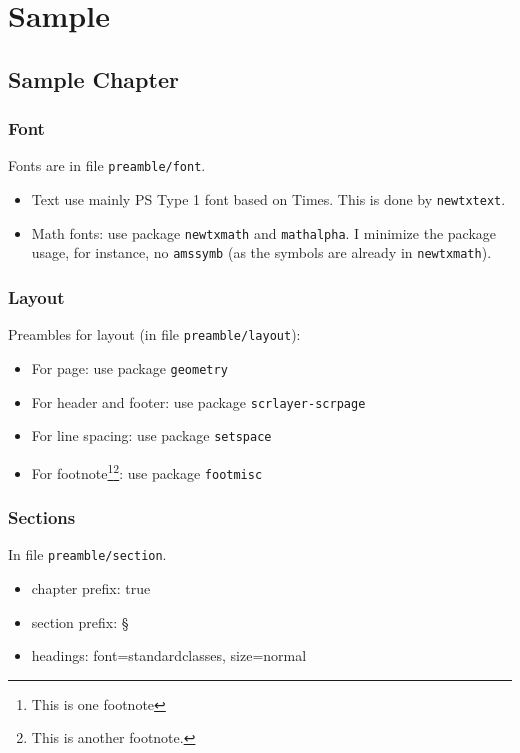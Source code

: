 \documentclass[%
	draft, %
	12pt, %
]{scrbook} %
\begin{document}
\frontmatter
\maketitle
\tableofcontents
\begin{abstract}
	
\end{abstract}
\begin{dedication}
	
\end{dedication}
\begin{acknowledgement}
	
\end{acknowledgement}
\mainmatter
\part{Sample}
\chapter{Sample Chapter}
\section{Font}
Fonts are in file \texttt{preamble/font}. 
\begin{itemize}
	\item Text use mainly PS Type 1 font based on Times. This is done by \texttt{newtxtext}.
	\item Math fonts: use package \texttt{newtxmath} and \texttt{mathalpha}. I minimize the package usage, for instance, no \texttt{amssymb} (as the symbols are already in \texttt{newtxmath}).
\end{itemize}
\section{Layout}
Preambles for layout (in file \texttt{preamble/layout}):
\begin{itemize}
	\item For page: use package \texttt{geometry}
	\item For header and footer: use package \texttt{scrlayer-scrpage}
	\item For line spacing: use package \texttt{setspace}
	\item For footnote\footnote{This is one footnote}\footnote{This is another footnote.}: use package \texttt{footmisc}
\end{itemize}
\section{Sections}
In file \texttt{preamble/section}.
\begin{itemize}
	\item chapter prefix: true 
	\item section prefix: \S
	\item headings: font=standardclasses, size=normal
\end{itemize}
\end{document}
